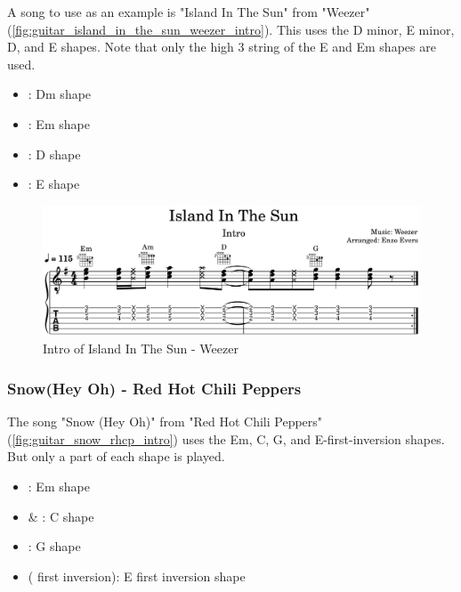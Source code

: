 A song to use as an example is "Island In The Sun" from "Weezer" (\autoref{fig:guitar_island_in_the_sun_weezer_intro}). This uses the D minor, E minor, D, and E shapes. Note that only the high 3 string of the E and Em shapes are used.

\begin{itemize}
	\setlength\itemsep{0em}
	\item {}: Dm shape
	\item {}: Em shape
	\item {}: D shape
	\item {}: E shape
\end{itemize}


\begin{figure}[h]
	\centering
	\includegraphics[width=\textwidth]{../../MuseScore/Guitar/IslandInTheSunWeezerIntro.png}
	\caption{Intro of Island In The Sun - Weezer}
	\label{fig:guitar_island_in_the_sun_weezer_intro}
\end{figure}

\newpage

\subsubsection{Snow(Hey Oh) - Red Hot Chili Peppers}

The song "Snow (Hey Oh)" from "Red Hot Chili Peppers" (\autoref{fig:guitar_snow_rhcp_intro}) uses the Em, C, G, and E-first-inversion shapes. But only a part of each shape is played.

\begin{itemize}
	\setlength\itemsep{0em}
	\item {}: Em shape
	\item {} \& : C shape
	\item {}: G shape
	\item {} ( first inversion): E first inversion shape
\end{itemize}

